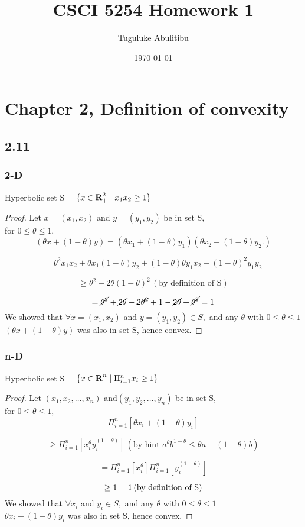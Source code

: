 \documentclass{article}
\title{CSCI 5254  Homework 1}
\author{Tuguluke Abulitibu}
\date\today
\newcommand{\reals}{{\mbox{\bf R}}}
\begin{document}
\maketitle %
\section*{Chapter 2, Definition of convexity}

\subsection*{2.11}
\subsubsection*{2-D}
Hyperbolic set S  =  $\{ x \in \reals^{2}_{+} \mid x_1x_2 \geq 1 \}$
\begin{proof}
Let  $x = (x_1, x_2)$ and $y = (y_1, y_2)$ be in set S, \\
for $0 \leq \theta \leq 1$,\\
\[\left(\theta x + (1- \theta)y\right) = \left(\theta x_1 + (1- \theta)y_1\right) \left(\theta x_2 + (1- \theta)y_2. \right) \]

\[= \theta^2  x_1x_2 + \theta x_1 (1- \theta)y_2 +   (1- \theta)\theta y_1 x_2 + (1- \theta)^2y_1y_2\ \]

\[ \ge \theta^2 + 2\theta(1-\theta)^2  \, (\mbox{by definition of S})\]

\[= \cancel{\theta^2}  + \cancel{2\theta}-\cancel{2 \theta^2} + 1 -\cancel{2 \theta} + \cancel{\theta^2} = 1\]
We showed that $\forall x = (x_1, x_2)$ and $y = (y_1, y_2) \in S,$ and any $\theta$ with $0 \leq \theta \le 1$\\
$ \left(\theta x + (1- \theta)y\right) $ was also in set S, hence convex.
\end{proof}
\subsubsection*{n-D}
Hyperbolic set S  =  $\{ x \in \reals^{n} \mid \Pi^{n}_{i=1} x_i \geq 1 \}$
\begin{proof}
Let  $(x_1, x_2, \dots, x_n)$ and$(y_1, y_2, \dots, y_n)$ be in set S, \\
for $0 \leq \theta \leq 1$,\\
\[ \Pi^{n}_{i=1} [\theta x_i + (1-\theta) y_i]\]

\[ \ge \Pi^{n}_{i=1} [ x_i^{\theta} y_i^{(1-\theta)}] \, (\mbox{by hint } a^\theta b^{1-\theta} \le \theta a + (1 - \theta)b )\]

\[ = \Pi^{n}_{i=1} [ x_i^{\theta}] \Pi^{n}_{i=1}[y_i^{(1-\theta)}] \]

\[ \ge 1 \time 1  = 1 \, (\mbox{by definition of S}) \]
We showed that  $\forall x_i$ and $y_i \in S,$ and  any $\theta$ with $0 \leq \theta \le 1$\\
$\theta x_i + (1-\theta) y_i$ was also in set S, hence convex.
\end{proof}
\end{document}
